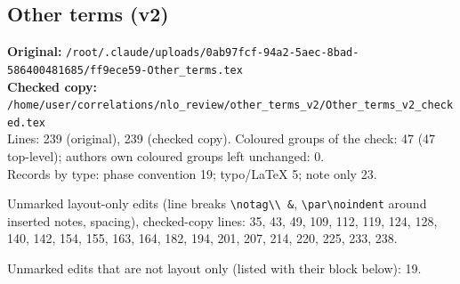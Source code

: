 \documentclass[10pt]{article}
\begin{document}
\subsection{Other terms (v2)}\label{sec:file-other_terms_v2}
\noindent\textbf{Original:} \texttt{/root/.claude/uploads/0ab97fcf-94a2-5aec-8bad-586400481685/ff9ece59-Other\_terms.tex}\\\textbf{Checked copy:} \texttt{/home/user/correlations/nlo\_review/other\_terms\_v2/Other\_terms\_v2\_checked.tex}\\
Lines: 239 (original), 239 (checked copy). Coloured groups of the check: 47 (47 top-level); author\textquotesingle s own coloured groups left unchanged: 0.\\
Records by type: phase convention 19; typo/LaTeX 5; note only 23.
\par\noindent Unmarked layout-only edits (line breaks \texttt{\textbackslash notag\textbackslash\textbackslash\ \&}, \texttt{\textbackslash par\textbackslash noindent} around inserted notes, spacing), checked-copy lines: 35, 43, 49, 109, 112, 119, 124, 128, 140, 142, 154, 155, 163, 164, 182, 194, 201, 207, 214, 220, 225, 233, 238.
\par\noindent Unmarked edits that are not layout only (listed with their block below): 19.
\end{document}

